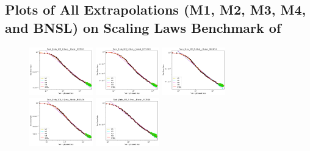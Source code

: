 \documentclass{article} %
\begin{document}
\fi


\iffalse



\clearpage
\clearpage
\subsection{Plots of All Extrapolations (M1, M2, M3, M4, and BNSL) on Scaling Laws Benchmark of \cite{Alabdulmohsi2022revisiting}}
\label{section:Plots_of_All_Extrapolations}

\begin{figure}[!htb]
    \centering

\includegraphics[width=0.245\textwidth]{figures/scaling_laws_benchmark_dataset_plots__all_functional_forms/birds_5___BiT_50_1.png}
\includegraphics[width=0.245\textwidth]{figures/scaling_laws_benchmark_dataset_plots__all_functional_forms/birds_5___BiT_101_3.png}
\includegraphics[width=0.245\textwidth]{figures/scaling_laws_benchmark_dataset_plots__all_functional_forms/birds_5___MiX_B_16.png}
\includegraphics[width=0.245\textwidth]{figures/scaling_laws_benchmark_dataset_plots__all_functional_forms/birds_5___MiX_L_16.png}
\includegraphics[width=0.245\textwidth]{figures/scaling_laws_benchmark_dataset_plots__all_functional_forms/birds_5___ViT_B_16.png}

\end{figure}
\end{document}
